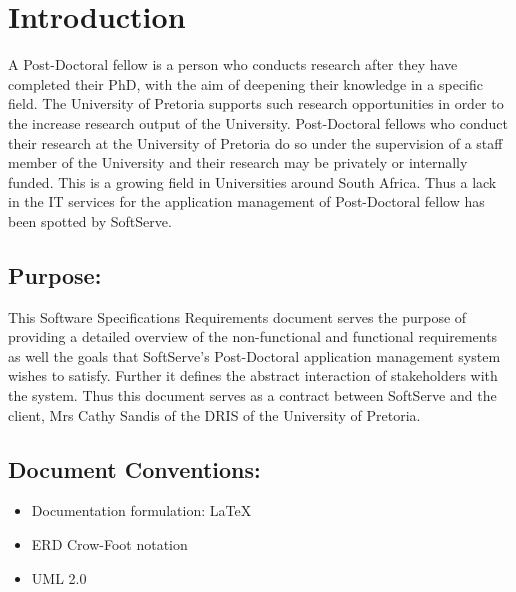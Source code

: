 \documentclass[12pt]{article}
\begin{document}
\section{Introduction} %
A Post-Doctoral fellow is a person who conducts research after they have completed their PhD, with the aim of deepening their knowledge in a specific field. The University of Pretoria supports such research opportunities in order to the increase research output of the University. Post-Doctoral fellows who conduct their research at the University of Pretoria do so under the supervision of a staff member of the University and their research may be privately or internally funded. This is a growing field in Universities around South Africa. Thus a lack in the IT services for the application management of Post-Doctoral fellow has been spotted by SoftServe.
\vspace{0.2in}

\subsection{Purpose:}
\vspace{0.2in}
This Software Specifications Requirements document serves the purpose of providing a detailed overview of the non-functional and functional requirements as well the goals that SoftServe's Post-Doctoral application management system wishes to satisfy. Further it defines the abstract interaction of stakeholders with the system. Thus this document serves as a contract between SoftServe and the client, Mrs Cathy Sandis of the DRIS of the University of Pretoria.

\vspace{0.2in}

\subsection{Document Conventions:}
\vspace{0.1in}
\begin{itemize}
\item Documentation formulation: LaTeX
\item ERD Crow-Foot notation
\item UML 2.0
\end{itemize}

\vspace{0.2in}
\end{document}
